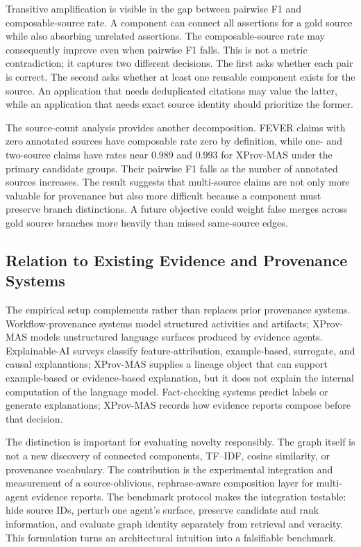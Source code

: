 \documentclass{ieeeaccess}
\begin{document}
Transitive amplification is visible in the gap between pairwise F1 and composable-source rate. A component can connect all assertions for a gold source while also absorbing unrelated assertions. The composable-source rate may consequently improve even when pairwise F1 falls. This is not a metric contradiction; it captures two different decisions. The first asks whether each pair is correct. The second asks whether at least one reusable component exists for the source. An application that needs deduplicated citations may value the latter, while an application that needs exact source identity should prioritize the former.

The source-count analysis provides another decomposition. FEVER claims with zero annotated sources have composable rate zero by definition, while one- and two-source claims have rates near 0.989 and 0.993 for XProv-MAS under the primary candidate groups. Their pairwise F1 falls as the number of annotated sources increases. The result suggests that multi-source claims are not only more valuable for provenance but also more difficult because a component must preserve branch distinctions. A future objective could weight false merges across gold source branches more heavily than missed same-source edges.

\subsection{Relation to Existing Evidence and Provenance Systems}
The empirical setup complements rather than replaces prior provenance systems. Workflow-provenance systems model structured activities and artifacts; XProv-MAS models unstructured language surfaces produced by evidence agents. Explainable-AI surveys classify feature-attribution, example-based, surrogate, and causal explanations; XProv-MAS supplies a lineage object that can support example-based or evidence-based explanation, but it does not explain the internal computation of the language model. Fact-checking systems predict labels or generate explanations; XProv-MAS records how evidence reports compose before that decision.

The distinction is important for evaluating novelty responsibly. The graph itself is not a new discovery of connected components, TF--IDF, cosine similarity, or provenance vocabulary. The contribution is the experimental integration and measurement of a source-oblivious, rephrase-aware composition layer for multi-agent evidence reports. The benchmark protocol makes the integration testable: hide source IDs, perturb one agent's surface, preserve candidate and rank information, and evaluate graph identity separately from retrieval and veracity. This formulation turns an architectural intuition into a falsifiable benchmark.
\end{document}
